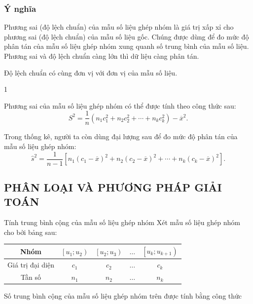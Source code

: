 \subsubsection{Ý nghĩa}
\begin{listEX}[1]
	\item [\iconCH] Phương sai (độ lệch chuẩn) của mẫu số liệu ghép nhóm là giá trị xấp xỉ cho phương sai (độ lệch chuẩn) của mẫu số liệu gốc. Chúng được dùng để đo mức độ phân tán của mẫu số liệu ghép nhóm xung quanh số trung bình của mẫu số liệu. Phương sai và độ lệch chuẩn càng lớn thì dữ liệu càng phân tán.
	\item [\iconCH] Độ lệch chuẩn có cùng đơn vị với đơn vị của mẫu số liệu.
\end{listEX}
\begin{luuy}
	\begin{enumEX}{1}
		\item Phương sai của mẫu số liệu ghép nhóm có thể được tính theo công thức sau:
		$$S^2=\dfrac{1}{n}\left(n_1 c_1^2+n_2 c_2^2+\cdots+n_k c_k^2\right)-\overline{x}^2.$$
		\item Trong thống kê, người ta còn dùng đại lượng sau để đo mức độ phân tán của mẫu số liệu ghép nhóm:
		$$\hat{s}^2=\dfrac{1}{n-1}\left[n_1\left(c_1-\overline{x}\right)^2+n_2\left(c_2-\overline{x}\right)^2+\cdots+n_k\left(c_k-\overline{x}\right)^2\right].$$
	\end{enumEX}
\end{luuy}


\subsection{PHÂN LOẠI VÀ PHƯƠNG PHÁP GIẢI TOÁN}
\begin{dang}{Tính trung bình cộng của mẫu số liệu ghép nhóm}
	Xét mẫu số liệu ghép nhóm cho bởi bảng sau:
	\begin{center}
		\begin{tabular}{|c|c|c|c|c|}
			\hline Nhóm &{$\left[u_1; u_2\right)$} &{$\left[u_2; u_3\right)$} & $\ldots$ &{$\left[u_k; u_{k+1}\right)$} \\
			\hline Giá trị đại diện & $c_1$ & $c_2$ & $\ldots$ & $c_k$ \\
			\hline Tần số & $n_1$ & $n_2$ & $\ldots$ & $n_k$ \\
			\hline
		\end{tabular}
	\end{center}
Số trung bình cộng của mẫu số liệu ghép nhóm trên được tính bằng công thức
\end{dang}

